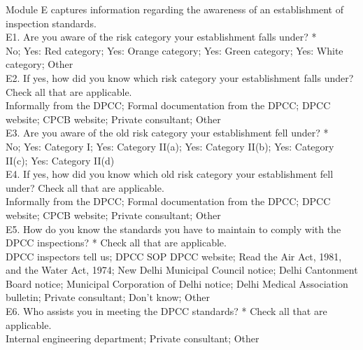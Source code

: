 \documentclass[a4paper, 12pt]{article}
\begin{document}
\begin{mdframed}[backgroundcolor=gray!20]
\begin{spacing}{0.5}
		Module E captures information regarding the awareness of an establishment of inspection standards. \\
		
		{E1. Are you aware of the risk category your establishment falls under? *} \\
		
		No; Yes: Red category; Yes: Orange category; Yes: Green category; Yes: White category; Other \\
		
		{E2. If yes, how did you know which risk category your establishment falls under? Check all that are applicable.} \\
		
		Informally from the DPCC; Formal documentation from the DPCC; DPCC website; CPCB website; Private consultant; Other \\
		
		{E3. Are you aware of the old risk category your establishment fell under? *}  \\
		
		No; Yes: Category I; Yes: Category II(a); Yes: Category II(b); Yes: Category II(c); Yes: Category II(d) \\
		
		{E4. If yes, how did you know which old risk category your establishment fell under?} Check all that are applicable. \\
		
		Informally from the DPCC; Formal documentation from the DPCC; DPCC website; CPCB website; Private consultant; Other \\		
		
		{E5. How do you know the standards you have to maintain to comply with the DPCC inspections? *} Check all that are applicable. \\
		
		DPCC inspectors tell us; DPCC SOP DPCC website; Read the Air Act, 1981, and the Water Act, 1974; New Delhi Municipal Council notice; Delhi Cantonment Board notice; Municipal Corporation of Delhi notice; Delhi Medical Association bulletin; Private consultant; Don't know; Other \\
		
		{E6. Who assists you in meeting the DPCC standards? *} Check all that are applicable. \\
		
		Internal engineering department; Private consultant; Other \\
		

\end{spacing}
\end{mdframed}
\end{document}
